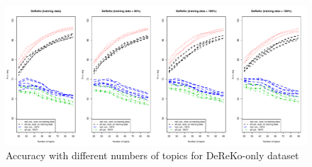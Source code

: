 \documentclass[11pt]{article}
\begin{document}

\begin{table}[h]
  \centering
  \caption{Evaluation at best achievable accuracy with the reduced set of topic domains in 10-fold cross-validation; Precision, Recall, and F-Measure are weighted averages across all categories}
  \label{tab:quality}
\end{table}

\begin{figure}[h]
  \centering
  \includegraphics[width=\textwidth]{graphics/dereko.pdf}
  \caption{Accuracy with different numbers of topics for DeReKo-only dataset}
  \label{fig:dereko}
\end{figure}
\end{document}
